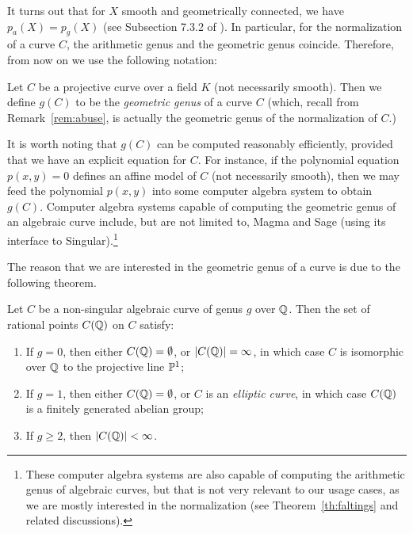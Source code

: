 It turns out that for $X$ smooth and geometrically connected, we have
$p_a(X) = p_g(X)$ (see Subsection 7.3.2 of \cite{MR1917232}). In
particular, for the normalization of a curve $C$, the arithmetic genus
and the geometric genus coincide. Therefore, from now on we use the
following notation:

\begin{definition}
  Let $C$ be a projective curve over a field $K$ (not necessarily
  smooth). Then we define $g(C)$ to be the \emph{geometric genus} of a
  curve $C$ (which, recall from Remark~\ref{rem:abuse}, is actually
  the geometric genus of the normalization of $C$.)
\end{definition}

\begin{remark}
  It is worth noting that $g(C)$ can be computed reasonably
  efficiently, provided that we have an explicit equation for $C$. For
  instance, if the polynomial equation $p(x, y) = 0$ defines an affine
  model of $C$ (not necessarily smooth), then we may feed the
  polynomial $p(x, y)$ into some computer algebra system to obtain
  $g(C)$. Computer algebra systems capable of computing the geometric
  genus of an algebraic curve include, but are not limited to, Magma
  and Sage (using its interface to Singular).\footnote{%
    These computer algebra systems are also capable of computing the
    arithmetic genus of algebraic curves, but that is not very
    relevant to our usage cases, as we are mostly interested in the
    normalization (see Theorem~\ref{th:faltings} and related
    discussions).}
\end{remark}

The reason that we are interested in the geometric genus of a curve is
due to the following theorem.

\begin{theorem}
  \label{th:faltings}
  Let $C$ be a non-singular algebraic curve of genus $g$ over
  $\Q$. Then the set of rational points $C(\Q)$ on $C$ satisfy:
  \begin{enumerate}
  \item If $g = 0$, then either $C(\Q) = \es$, or $|C(\Q)| = \infty$,
    in which case $C$ is isomorphic over $\Q$ to the projective line
    $\P^1$;

  \item If $g = 1$, then either $C(\Q) = \es$, or $C$ is an
    \emph{elliptic curve}, in which case $C(\Q)$ is a finitely
    generated abelian group;

  \item If $g \ge 2$, then $|C(\Q)| < \infty$.
  \end{enumerate}
\end{theorem}

